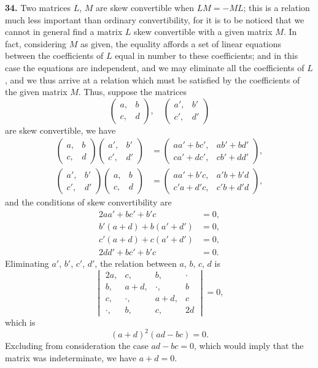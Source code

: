 \documentclass[11pt,a4paper]{book}
\begin{document}
\begin{center}
\medskip
\noindent\textbf{34.} Two matrices $L$, $M$ are skew convertible when $LM = -ML$; this is a relation much less important than ordinary convertibility, for it is to be noticed that we cannot in general find a matrix $L$ skew convertible with a given matrix $M$. In fact, considering $M$ as given, the equality affords a set of linear equations between the coefficients of $L$ equal in number to these coefficients; and in this case the equations are independent, and we may eliminate all the coefficients of $L$, and we thus arrive at a relation which must be satisfied by the coefficients of the given matrix $M$. Thus, suppose the matrices
\[
\begin{pmatrix} a, & b \\ c, & d \end{pmatrix},\quad
\begin{pmatrix} a', & b' \\ c', & d' \end{pmatrix}
\]
are skew convertible, we have
\begin{align*}
\begin{pmatrix} a, & b \\ c, & d \end{pmatrix}
\begin{pmatrix} a', & b' \\ c', & d' \end{pmatrix}
&= \begin{pmatrix} aa'+bc', & ab'+bd' \\ ca'+dc', & cb'+dd' \end{pmatrix}, \\
\begin{pmatrix} a', & b' \\ c', & d' \end{pmatrix}
\begin{pmatrix} a, & b \\ c, & d \end{pmatrix}
&= \begin{pmatrix} aa'+b'c, & a'b+b'd \\ c'a+d'c, & c'b+d'd \end{pmatrix},
\end{align*}
and the conditions of skew convertibility are
\begin{align*}
2aa'+bc'+b'c &= 0, \\
b'(a+d)+b(a'+d') &= 0, \\
c'(a+d)+c(a'+d') &= 0, \\
2dd'+bc'+b'c &= 0.
\end{align*}
Eliminating $a'$, $b'$, $c'$, $d'$, the relation between $a$, $b$, $c$, $d$ is
\[
\begin{vmatrix}
2a, & c, & b, & \cdot \\
b, & a+d, & \cdot, & b \\
c, & \cdot, & a+d, & c \\
\cdot, & b, & c, & 2d
\end{vmatrix} = 0,
\]
which is
\[(a+d)^2(ad-bc) = 0.\]
Excluding from consideration the case $ad-bc=0$, which would imply that the matrix was indeterminate, we have $a+d=0$.


\end{center}
\end{document}
